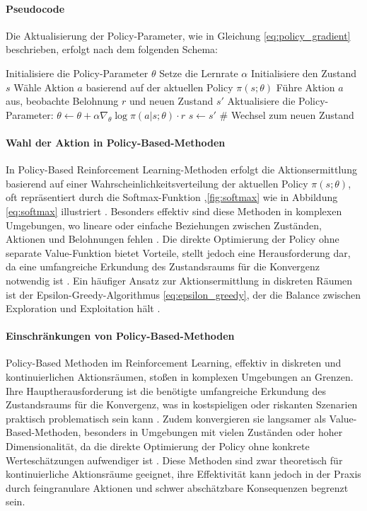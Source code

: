 \paragraph{Pseudocode}
Die Aktualisierung der Policy-Parameter, wie in Gleichung \ref{eq:policy_gradient} beschrieben, erfolgt nach dem folgenden Schema:
\begin{algorithmic}
\STATE Initialisiere die Policy-Parameter \(\theta\)
\STATE Setze die Lernrate \(\alpha\)
    \STATE Initialisiere den Zustand \(s\)
        \STATE Wähle Aktion \(a\) basierend auf der aktuellen Policy \(\pi(s; \theta)\)
        \STATE Führe Aktion \(a\) aus, beobachte Belohnung \(r\) und neuen Zustand \(s'\)
        \STATE Aktualisiere die Policy-Parameter:
        \STATE \(\theta \leftarrow \theta + \alpha \nabla_{\theta} \log \pi(a | s; \theta) \cdot r\)
        \STATE \(s \leftarrow s'\)  \# Wechsel zum neuen Zustand
    \ENDWHILE
\ENDFOR
\end{algorithmic}

\paragraph{Wahl der Aktion in Policy-Based-Methoden}

In Policy-Based Reinforcement Learning-Methoden erfolgt die Aktionsermittlung basierend auf einer Wahrscheinlichkeitsverteilung der aktuellen Policy \(\pi(s; \theta)\), oft repräsentiert durch die Softmax-Funktion ,\ref{fig:softmax} wie in Abbildung \ref{eq:softmax} illustriert \cite{russell2021ai}. Besonders effektiv sind diese Methoden in komplexen Umgebungen, wo lineare oder einfache Beziehungen zwischen Zuständen, Aktionen und Belohnungen fehlen \cite{SuttonBarto2018}. Die direkte Optimierung der Policy ohne separate Value-Funktion bietet Vorteile, stellt jedoch eine Herausforderung dar, da eine umfangreiche Erkundung des Zustandsraums für die Konvergenz notwendig ist \cite{morales2020grokking}. Ein häufiger Ansatz zur Aktionsermittlung in diskreten Räumen ist der Epsilon-Greedy-Algorithmus \ref{eq:epsilon_greedy}, der die Balance zwischen Exploration und Exploitation hält \cite{SuttonBarto2018}.

\paragraph{Einschränkungen von Policy-Based-Methoden}
%
Policy-Based Methoden im Reinforcement Learning, effektiv in diskreten und kontinuierlichen Aktionsräumen, stoßen in komplexen Umgebungen an Grenzen. Ihre Hauptherausforderung ist die benötigte umfangreiche Erkundung des Zustandsraums für die Konvergenz, was in kostspieligen oder riskanten Szenarien praktisch problematisch sein kann \cite{SuttonBarto2018}. Zudem konvergieren sie langsamer als Value-Based-Methoden, besonders in Umgebungen mit vielen Zuständen oder hoher Dimensionalität, da die direkte Optimierung der Policy ohne konkrete Werteschätzungen aufwendiger ist \cite{SuttonBarto2018}. Diese Methoden sind zwar theoretisch für kontinuierliche Aktionsräume geeignet, ihre Effektivität kann jedoch in der Praxis durch feingranulare Aktionen und schwer abschätzbare Konsequenzen begrenzt sein.

